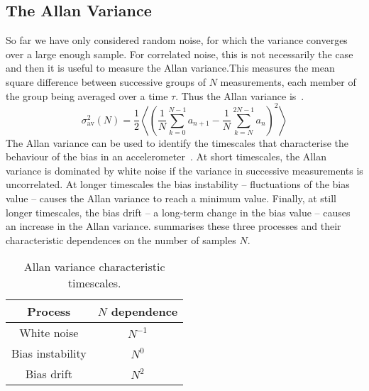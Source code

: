 \subsection{The Allan Variance}\label{subsec:allan_variance}
So far we have only considered random noise, for which the variance
converges over a large enough sample. For correlated noise, this is
not necessarily the case and then it is useful to measure the Allan
variance.This measures the mean square difference between successive groups of
$N$ measurements, each member of the group being averaged over a time
$\tau$. Thus the Allan
variance is~\cite{Allan1966}. 
\begin{equation}
  \sigma_\text{av}^2(N) = \frac{1}{2}
  \left\langle
  \left(\frac{1}{N}\sum_{k=0}^{N-1}a_{n+1}-\frac{1}{N}\sum_{k=N}^{2N-1}a_n\right)^2\right\rangle
  \label{eq:allan_var_mean}
\end{equation}
The Allan variance can be used to identify the timescales that
characterise the behaviour of the bias in an
accelerometer~\cite{El-Sheimy2008}. At short
timescales, the Allan variance is dominated by white noise if the
variance in successive measurements is uncorrelated. 
At longer timescales the bias instability -- fluctuations of
the bias value -- causes the Allan variance to reach a minimum value.
Finally, at still longer timescales, the bias drift -- a long-term
change in the bias value -- causes
an increase in the Allan variance.  summarises
these three processes and their characteristic dependences on the
number of samples $N$.
\begin{table}[htpb]
  \centering
  \begin{tabular}{cc}
  \toprule
    Process & $N$ dependence \\ 
    \midrule
    White noise & $N^{-1}$ \\
    Bias instability & $N^{0}$ \\
    Bias drift & $N^{2}$\\
    \bottomrule
  \end{tabular}
  \caption{Allan variance characteristic timescales.}
  \label{tab:avar}
\end{table}


